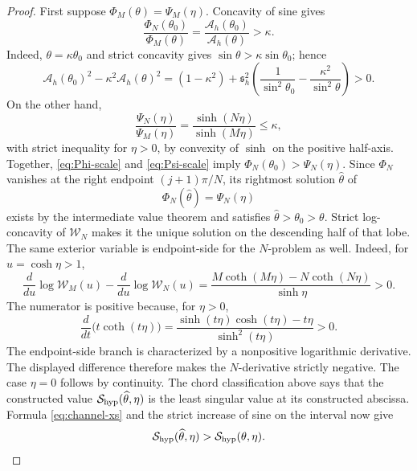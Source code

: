 \documentclass[10pt,twoside]{siamart1116}
\numberwithin{equation}{section}
\begin{document}
\begin{proof}
First suppose \(\Phi_M(\theta)=\Psi_M(\eta)\).  Concavity of sine gives
\begin{equation}\label{eq:Phi-scale}
 \frac{\Phi_N(\theta_0)}{\Phi_M(\theta)}
 =\frac{\mathcal A_h(\theta_0)}{\mathcal A_h(\theta)}>\kappa.
\end{equation}
Indeed, \(\theta=\kappa\theta_0\) and strict concavity gives
\(\sin\theta>\kappa\sin\theta_0\); hence
\[
 \mathcal A_h(\theta_0)^2-\kappa^2\mathcal A_h(\theta)^2
 =(1-\kappa^2)+\mathfrak s_h^2\left(
 \frac1{\sin^2\theta_0}-\frac{\kappa^2}{\sin^2\theta}
 \right)>0.
\]
On the other hand,
\begin{equation}\label{eq:Psi-scale}
 \frac{\Psi_N(\eta)}{\Psi_M(\eta)}
 =\frac{\sinh(N\eta)}{\sinh(M\eta)}\leq\kappa,
\end{equation}
with strict inequality for \(\eta>0\), by convexity of \(\sinh\) on
the positive half-axis.  Together, \eqref{eq:Phi-scale} and
\eqref{eq:Psi-scale} imply
\(\Phi_N(\theta_0)>\Psi_N(\eta)\).  Since \(\Phi_N\) vanishes at the right
endpoint \((j+1)\pi/N\), its rightmost solution
\(\widehat\theta\) of
\[
 \Phi_N(\widehat\theta)=\Psi_N(\eta)
\]
exists by the intermediate value theorem and satisfies
\(\widehat\theta>\theta_0>\theta\).  Strict log-concavity of
\(\mathcal W_N\) makes it the unique solution on the descending half
of that lobe.  The same exterior
variable is endpoint-side for the \(N\)-problem as well.  Indeed, for
\(u=\cosh\eta>1\),
\[
 \frac{d}{du}\log\mathcal W_M(u)-
 \frac{d}{du}\log\mathcal W_N(u)
 =\frac{M\coth(M\eta)-N\coth(N\eta)}{\sinh\eta}>0.
\]
The numerator is positive because, for \(\eta>0\),
\[
 \frac{d}{dt}\bigl(t\coth(t\eta)\bigr)
 =\frac{\sinh(t\eta)\cosh(t\eta)-t\eta}{\sinh^2(t\eta)}>0.
\]
The endpoint-side branch is characterized by a nonpositive logarithmic
derivative.  The displayed difference therefore makes the
\(N\)-derivative strictly negative.  The case \(\eta=0\) follows by
continuity.
The chord classification above says that the constructed value
\(\mathcal S_{\rm hyp}(\widehat\theta,\eta)\) is the least singular
value at its constructed abscissa.  Formula
\eqref{eq:channel-xs} and the strict increase of sine on the interval
now give
\begin{equation}\label{eq:hyper-height-increase}
 \mathcal S_{\rm hyp}(\widehat\theta,\eta)
 >\mathcal S_{\rm hyp}(\theta,\eta).
\end{equation}


\end{proof}
\end{document}
